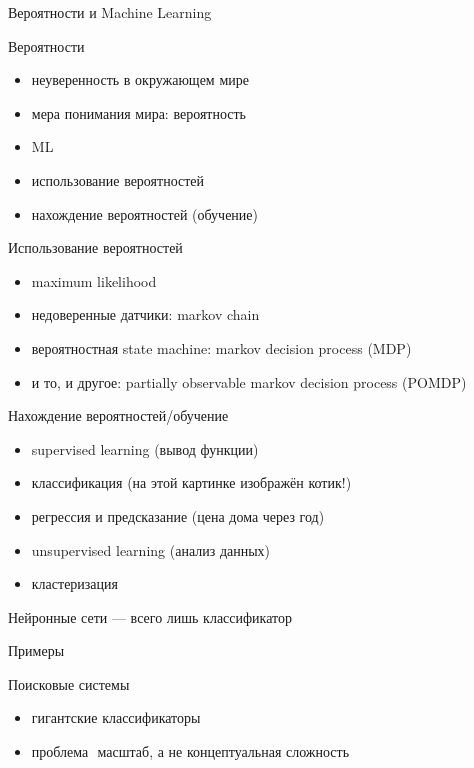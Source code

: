 \documentclass[10pt]{beamer}
\begin{document}
\begin{frame}
  \Large
  Вероятности и Machine Learning
\end{frame}

\begin{frame}{Вероятности}
  \begin{itemize}
  \item неуверенность в окружающем мире
  \item мера понимания мира: вероятность
  \item ML
  \item использование вероятностей
  \item нахождение вероятностей (обучение)
  \end{itemize}
\end{frame}

\begin{frame}{Использование вероятностей}
  \begin{itemize}
  \item maximum likelihood
  \item недоверенные датчики: markov chain
  \item вероятностная state machine: markov decision process (MDP)
  \item и то, и другое: partially observable markov decision process (POMDP)
  \end{itemize}
\end{frame}

\begin{frame}{Нахождение вероятностей/обучение}
  \begin{itemize}
  \item supervised learning (вывод функции)
  \item классификация (на этой картинке изображён котик!)
  \item регрессия и предсказание (цена дома через год)
  \item unsupervised learning (анализ данных)
  \item кластеризация
  \end{itemize}
  \begin{center}
    Нейронные сети — всего лишь классификатор
  \end{center}
\end{frame}

\begin{frame}
  \Large
  Примеры
\end{frame}

\begin{frame}{Поисковые системы}
  \begin{itemize}
  \item гигантские классификаторы
  \item проблема ­ масштаб, а не концептуальная сложность
  \end{itemize}
\end{frame}
\end{document}
